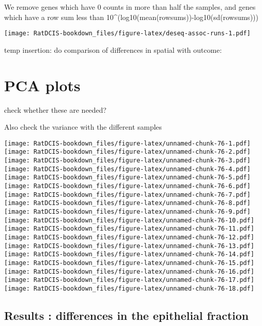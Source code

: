 \documentclass[
]{book}
\begin{document}
We remove genes which have 0 counts in more than half the samples, and genes which have a row sum less than 10\^{}(log10(mean(rowsums))-log10(sd(rowsums)))

\texttt{[image: RatDCIS-bookdown\_files/figure-latex/deseq-assoc-runs-1.pdf]}

temp insertion: do comparison of differences in spatial with outcome:

\hypertarget{pca-plots-1}{%
\section{PCA plots}\label{pca-plots-1}}

check whether these are needed?

Also check the variance with the different samples

\texttt{[image: RatDCIS-bookdown\_files/figure-latex/unnamed-chunk-76-1.pdf]} \texttt{[image: RatDCIS-bookdown\_files/figure-latex/unnamed-chunk-76-2.pdf]} \texttt{[image: RatDCIS-bookdown\_files/figure-latex/unnamed-chunk-76-3.pdf]} \texttt{[image: RatDCIS-bookdown\_files/figure-latex/unnamed-chunk-76-4.pdf]} \texttt{[image: RatDCIS-bookdown\_files/figure-latex/unnamed-chunk-76-5.pdf]} \texttt{[image: RatDCIS-bookdown\_files/figure-latex/unnamed-chunk-76-6.pdf]} \texttt{[image: RatDCIS-bookdown\_files/figure-latex/unnamed-chunk-76-7.pdf]} \texttt{[image: RatDCIS-bookdown\_files/figure-latex/unnamed-chunk-76-8.pdf]} \texttt{[image: RatDCIS-bookdown\_files/figure-latex/unnamed-chunk-76-9.pdf]} \texttt{[image: RatDCIS-bookdown\_files/figure-latex/unnamed-chunk-76-10.pdf]} \texttt{[image: RatDCIS-bookdown\_files/figure-latex/unnamed-chunk-76-11.pdf]} \texttt{[image: RatDCIS-bookdown\_files/figure-latex/unnamed-chunk-76-12.pdf]} \texttt{[image: RatDCIS-bookdown\_files/figure-latex/unnamed-chunk-76-13.pdf]} \texttt{[image: RatDCIS-bookdown\_files/figure-latex/unnamed-chunk-76-14.pdf]} \texttt{[image: RatDCIS-bookdown\_files/figure-latex/unnamed-chunk-76-15.pdf]} \texttt{[image: RatDCIS-bookdown\_files/figure-latex/unnamed-chunk-76-16.pdf]} \texttt{[image: RatDCIS-bookdown\_files/figure-latex/unnamed-chunk-76-17.pdf]} \texttt{[image: RatDCIS-bookdown\_files/figure-latex/unnamed-chunk-76-18.pdf]}

\hypertarget{results-differences-in-the-epithelial-fraction}{%
\subsection{Results : differences in the epithelial fraction}\label{results-differences-in-the-epithelial-fraction}}
\end{document}

